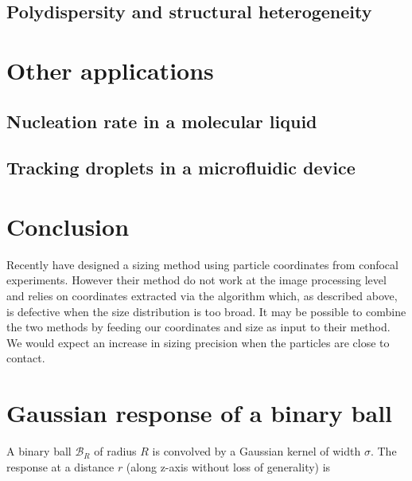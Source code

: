 \documentclass[8.5pt,twoside,twocolumn]{article}
\begin{document}
\subsection*{Polydispersity and structural heterogeneity}

\section*{Other applications}

\subsection*{Nucleation rate in a molecular liquid}

\subsection*{Tracking droplets in a microfluidic device}

\section*{Conclusion}
Recently \citet{Kurita2011,Kurita2011b} have designed a sizing method using particle coordinates from confocal experiments. However their method do not work at the image processing level and relies on coordinates extracted via the \citet{Crocker1996} algorithm which, as described above, is defective when the size distribution is too broad. It may be possible to combine the two methods by feeding our coordinates and size as input to their method. We would expect an increase in sizing precision when the particles are close to contact.

\appendix

\section{Gaussian response of a binary ball}
\label{sec:gaussian_vs_ball}

A binary ball $\mathcal{B}_R$ of radius $R$ is convolved by a Gaussian kernel of width $\sigma$. The response at a distance $r$ (along z-axis without loss of generality) is
\end{document}
